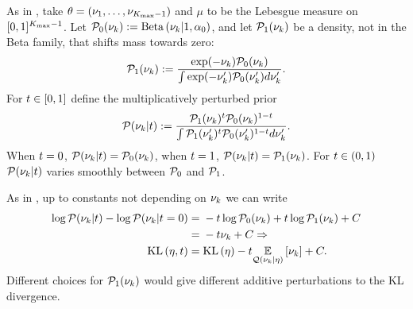 \begin{ex}
%
As in , take $\theta = (\nu_1, \ldots, \nu_{{K_{\mathrm{max}}}-1})$
and $\mu$ to be the Lebesgue measure on $[0,1]^{{K_{\mathrm{max}}}-1}$. Let $\mathcal{P}_{0}(\nu_{k}) :=
\mathrm{Beta}\left(\nu_{k} \vert 1, \alpha_0\right)$, and let $\mathcal{P}_{1}(\nu_{k})$ be a density, not
in the Beta family, that shifts mass towards zero:
%
\begin{align*}
%
\palt(\nuk) :=
    \frac{\exp(-\nuk)\pbase(\nuk)}{\int \exp(-\nuk')\pbase(\nuk') d\nuk'}.
%
\end{align*}
%
For $t \in [0,1]$ define the multiplicatively perturbed prior
%
\begin{align*}
%
\p(\nuk \vert \t) :=
    \frac{\palt(\nuk)^{\t} \pbase(\nuk)^{1-\t}}
         {\int \palt(\nuk')^{\t} \pbase(\nuk')^{1-\t} d\nuk'}.
%
\end{align*}
%
When $t = 0$, $\mathcal{P}(\nu_{k} \vert t) = \mathcal{P}_{0}(\nu_{k})$, when $t = 1$,
$\mathcal{P}(\nu_{k} \vert t)  = \mathcal{P}_{1}(\nu_{k})$.  For $t \in (0,1)$
$\mathcal{P}(\nu_{k} \vert t)$ varies smoothly between $\mathcal{P}_{0}$ and $\mathcal{P}_{1}$.

As in , up to constants not depending on
$\nu_{k}$ we can write
%
\begin{align*}
%
\log \p(\nuk \vert \t) - \log \p(\nuk \vert \t=0) ={}&
    -\t \log \pbase(\nuk) + \t \log \palt(\nuk) + \const
\\={}& -\t \nuk + \const \Rightarrow
\\
\KL{\eta, \t} ={}& \KL{\eta} -\t \expect{\q(\nuk\vert\eta)}{\nuk} + \const.
%
\end{align*}
%
Different choices for $\mathcal{P}_{1}(\nu_{k})$ would give different additive
perturbations to the KL divergence.
%
\end{ex}
%
